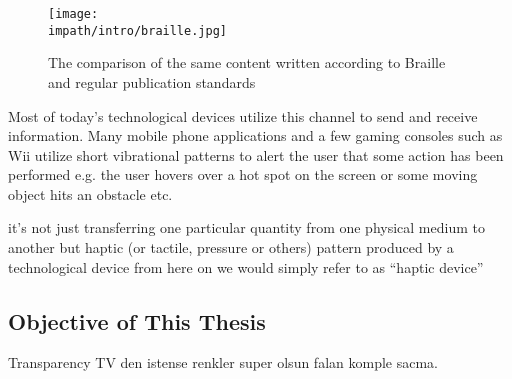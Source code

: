 \begin{figure}%
\centering
\texttt{[image: \\impath/intro/braille.jpg]}%
\caption{The comparison of the same content written according to Braille and regular publication standards}%
\label{fig:braille}%
\end{figure}

Most of today's technological devices utilize this channel to send and receive information. Many mobile phone applications and a few gaming consoles such as Wii\raisebox{0.5ex}{\scriptsize\texttrademark} utilize short vibrational patterns to alert the user that some action has been performed e.g. the user hovers over a hot spot on the screen or some moving object hits an obstacle etc. 







it's not just transferring one particular quantity from one physical medium to another but  haptic (or tactile, pressure or others) pattern produced by a technological device from here on we would simply refer to as ``haptic device''

\subsection{Objective of This Thesis}

Transparency TV den istense renkler super olsun falan komple sacma. 


%
%
%
